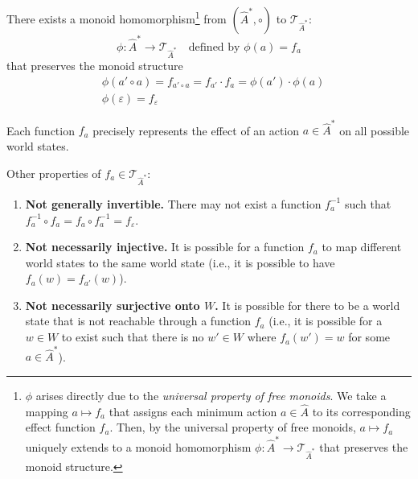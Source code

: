 There exists a monoid homomorphism\footnote{
$\phi$ arises directly due to the \emph{universal property of free monoids}.
We take a mapping $a \mapsto f_{a}$ that assigns each minimum action $a \in \hat{A}$ to its corresponding effect function $f_{a}$.
Then, by the universal property of free monoids, $a \mapsto f_{a}$ uniquely extends to a monoid homomorphism $\phi : \hat{A}^{\ast} \to \mathcal{T}_{\hat{A}^{\ast}}$ that preserves the monoid structure.
} from $(\hat{A}^{\ast}, \circ)$ to $\mathcal{T}_{\hat{A}^{\ast}}$:
\begin{equation}
	\phi : \hat{A}^{\ast} \to \mathcal{T}_{\hat{A}^{\ast}} \quad\text{defined by $\phi(a) = f_{a}$}
\end{equation}
that preserves the monoid structure
\begin{align}
	 & \phi(a' \circ a) = f_{a' \circ a} = f_{a'} \cdot f_{a} = \phi(a') \cdot \phi(a) \\
	 & \phi(\varepsilon) = f_{\varepsilon}
\end{align}


Each function $f_{a}$ precisely represents the effect of an action $a \in \hat{A}^{*}$ on all possible world states.

Other properties of $f_{a} \in \mathcal{T}_{\hat{A}^{\ast}}$:
\begin{enumerate}
	\item \textbf{Not generally invertible.}
	      There may not exist a function $f_{a}^{-1}$ such that $f_{a}^{-1} \circ f_{a} = f_{a} \circ f_{a}^{-1} = f_{\varepsilon}$.
	\item \textbf{Not necessarily injective.}
	      It is possible for a function $f_{a}$ to map different world states to the same world state (i.e., it is possible to have $f_{a}(w) = f_{a'}(w)$).
	\item \textbf{Not necessarily surjective onto $W$.}
	      It is possible for there to be a world state that is not reachable through a function $f_{a}$ (i.e., it is possible for a $w \in W$ to exist such that there is no $w' \in W$ where $f_{a}(w') = w$ for some $a \in \hat{A}^{\ast}$).
\end{enumerate}


